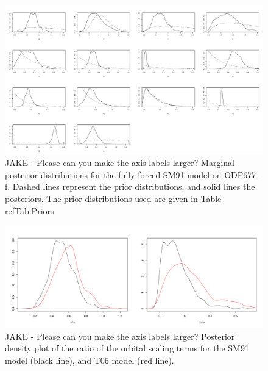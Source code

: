 \documentclass[a4paper,12pt]{article}
\begin{document}
\clearpage

\begin{figure}
\centering
\includegraphics[width=\textwidth]{LR04677SM91.pdf}
\caption{
JAKE - Please can you make the axis labels larger?
Marginal posterior distributions for the fully forced SM91 model on ODP677-f. Dashed lines represent the prior distributions, and solid lines the posteriors. 
The prior distributions used are given in Table ref{Tab:Priors}}
\label{Fig:PosteriorODP}
\end{figure}



\clearpage

\begin{figure}
\centering
\includegraphics[width=\textwidth]{ForcingComparison.pdf}
\caption{
JAKE - Please can you make the axis labels larger?
Posterior density plot of the ratio of the orbital scaling terms for the SM91 model (black line), and T06 model (red line).}
\label{Fig:AFRatio}
\end{figure}


\clearpage
\end{document}
